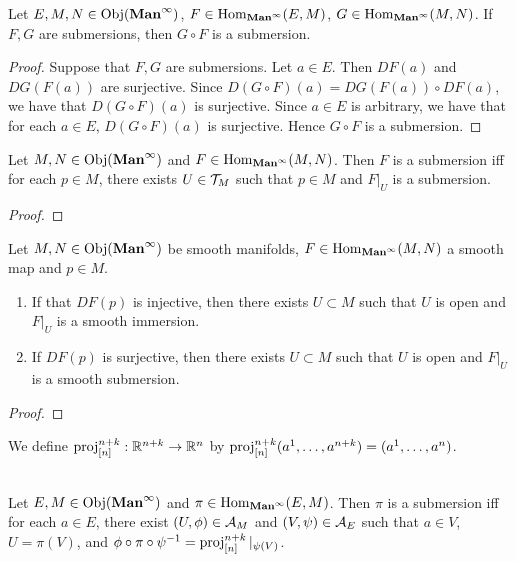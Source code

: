 \documentclass{book}
\begin{document}
	\begin{ex} 
		Let $E, M,N  \in \operatorname{Obj}(\operatorname*{\text{\textbf{Man}}^{\infty}})$,  $F \in \operatorname{Hom}_{\operatorname*{\text{\textbf{Man}}^{\infty}}}(E, M)$, $G \in \operatorname{Hom}_{\operatorname*{\text{\textbf{Man}}^{\infty}}}(M, N)$. If $F, G$ are submersions, then $G \circ F$ is a submersion.
	\end{ex}
	
	\begin{proof}
		Suppose that $F, G$ are submersions. Let $a \in E$. Then $DF(a)$ and $DG(F(a))$ are surjective. Since $D(G \circ F)(a) = DG(F(a)) \circ DF(a)$, we have that $D(G \circ F)(a)$ is surjective. Since $a \in E$ is arbitrary, we have that for each $a \in E$, $D(G \circ F)(a)$ is surjective. Hence $G \circ F$ is a submersion.
	\end{proof}

	\begin{ex} 
		Let $M,N  \in \operatorname{Obj}(\operatorname*{\text{\textbf{Man}}^{\infty}})$ and  $F \in \operatorname{Hom}_{\operatorname*{\text{\textbf{Man}}^{\infty}}}(M, N)$. Then $F$ is a submersion iff for each $p \in M$, there exists $U \in \mathcal{T}_M$ such that $p \in M$ and $F|_U$ is a submersion.
	\end{ex}
	
	\begin{proof}
	\end{proof}
	
	\begin{ex} 
		Let $M,N \in \operatorname{Obj}(\operatorname*{\text{\textbf{Man}}^{\infty}})$ be smooth manifolds, $F \in \operatorname{Hom}_{\operatorname*{\text{\textbf{Man}}^{\infty}}}(M,N)$ a smooth map and $p \in M$.
		\begin{enumerate}
			\item If that $DF(p)$ is injective, then there exists $U \subset M$ such that $U$ is open and $F|_U$ is a smooth immersion.
			\item If $DF(p)$ is surjective, then there exists $U \subset M$ such that $U$ is open and $F|_U$ is a smooth submersion.
		\end{enumerate}
	\end{ex}

	\begin{proof}
	\end{proof}	

	\begin{note}
		We define $\operatorname{\text{proj}}^{n+k}_{[n]}: \mathbb{R}^{n+k} \rightarrow \mathbb{R}^n$ by $\operatorname{\text{proj}}^{n+k}_{[n]}(a^1, \ldots, a^{n+k}) = (a^1, \ldots, a^n)$.
	\end{note}

	\begin{ex}   \\
		Let $E, M \in \operatorname{Obj}(\operatorname*{\text{\textbf{Man}}^{\infty}})$ and $\pi \in \operatorname{Hom}_{\operatorname*{\text{\textbf{Man}}^{\infty}}}(E, M)$. Then $\pi$ is a submersion iff for each $a \in E$, there exist $(U, \phi) \in \mathcal{A}_M$ and $(V, \psi) \in \mathcal{A}_E$ such that $a \in V$, $U = \pi(V)$, and $\phi \circ \pi \circ \psi^{-1} = \operatorname{\text{proj}}^{n+k}_{[n]}|_{\psi(V)}$.
	\end{ex}
\end{document}
